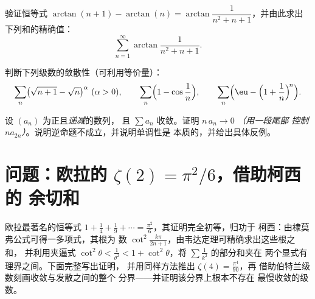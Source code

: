 \begin{exercise}[$\star\star$]\label{exo:b2:series:10}
验证恒等式 $\arctan(n+1) - \arctan(n) =
\arctan\dfrac{1}{n^2 + n + 1}$，并由此求出下列和的精确值：
\[
\sum_{n=1}^{\infty} \arctan\frac{1}{n^2 + n + 1} .
\]
\end{exercise}

\begin{exercise}[$\star\star$]\label{exo:b2:series:11}
判断下列级数的敛散性（可利用等价量）：
\[
\sum_n \bigl(\sqrt{n+1} - \sqrt n\bigr)^{\alpha}
\ (\alpha > 0), \qquad
\sum_n \Bigl(1 - \cos\frac1n\Bigr), \qquad
\sum_n \Bigl(\eu - \Bigl(1 + \frac1n\Bigr)^{\!n}\Bigr).
\]
\end{exercise}

\begin{exercise}[$\star\star\star$]\label{exo:b2:series:12}
设 $(a_n)$ 为正且\emph{递减}的数列，
且 $\sum a_n$ 收敛。证明 $n\,a_n \to 0$ \emph{（用一段尾部
控制 $n a_{2n}$）}。说明逆命题不成立，并说明单调性是
本质的，并给出具体反例。
\end{exercise}

\section{问题：欧拉的 $\zeta(2) = \pi^2/6$，借助柯西的
余切和}

欧拉最著名的恒等式 $1 + \frac14 + \frac19 + \cdots =
\frac{\pi^2}6$，其证明完全初等，归功于
柯西：由棣莫弗公式可得一多项式，其根为
数 $\cot^2\frac{k\pi}{2n+1}$，由韦达定理可精确求出这些根之和，
并利用夹逼式 $\cot^2\theta < \frac{1}{\theta^2} <
1 + \cot^2\theta$，将 $\sum\frac1{k^2}$ 的部分和夹在
两个显式有理界之间。下面完整写出证明，
并用同样方法推出 $\zeta(4) = \frac{\pi^4}{90}$，再
借助伯特兰级数刻画收敛与发散之间的整个
分界——并证明该分界上根本不存在
最慢收敛的级数。


